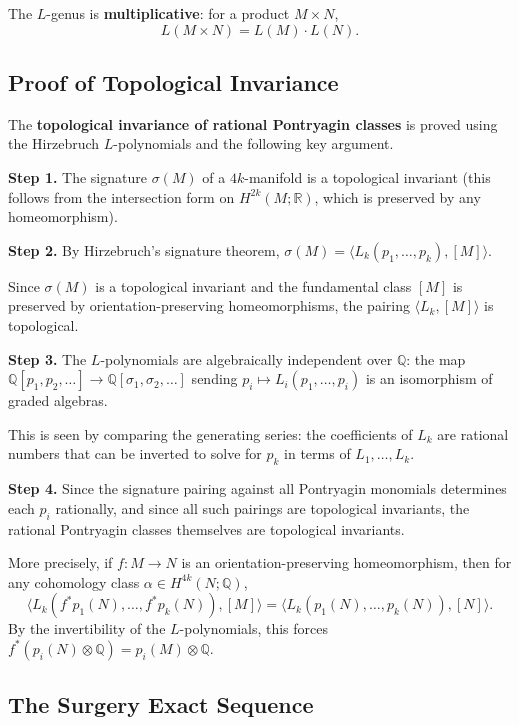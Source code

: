 The $L$-genus is \textbf{multiplicative}: for a product $M \times N$,
\[
L(M \times N) = L(M) \cdot L(N).
\]

\subsection*{Proof of Topological Invariance}

The \textbf{topological invariance of rational Pontryagin classes} is proved using the Hirzebruch $L$-polynomials and the following key argument.

\textbf{Step 1.} The signature $\sigma(M)$ of a $4k$-manifold is a topological invariant (this follows from the intersection form on $H^{2k}(M;\mathbb{R})$, which is preserved by any homeomorphism).

\textbf{Step 2.} By Hirzebruch's signature theorem, $\sigma(M) = \langle L_k(p_1, \ldots, p_k), [M] \rangle$.

Since $\sigma(M)$ is a topological invariant and the fundamental class $[M]$ is preserved by orientation-preserving homeomorphisms, the pairing $\langle L_k, [M] \rangle$ is topological.

\textbf{Step 3.} The $L$-polynomials are algebraically independent over $\mathbb{Q}$: the map $\mathbb{Q}[p_1, p_2, \ldots] \to \mathbb{Q}[\sigma_1, \sigma_2, \ldots]$ sending $p_i \mapsto L_i(p_1, \ldots, p_i)$ is an isomorphism of graded algebras.

This is seen by comparing the generating series: the coefficients of $L_k$ are rational numbers that can be inverted to solve for $p_k$ in terms of $L_1, \ldots, L_k$.

\textbf{Step 4.} Since the signature pairing against all Pontryagin monomials determines each $p_i$ rationally, and since all such pairings are topological invariants, the rational Pontryagin classes themselves are topological invariants.

More precisely, if $f: M \to N$ is an orientation-preserving homeomorphism, then for any cohomology class $\alpha \in H^{4k}(N; \mathbb{Q})$,
\[
\langle L_k(f^*p_1(N), \ldots, f^*p_k(N)), [M] \rangle = \langle L_k(p_1(N), \ldots, p_k(N)), [N] \rangle.
\]
By the invertibility of the $L$-polynomials, this forces $f^*(p_i(N) \otimes \mathbb{Q}) = p_i(M) \otimes \mathbb{Q}$.

\subsection*{The Surgery Exact Sequence}

